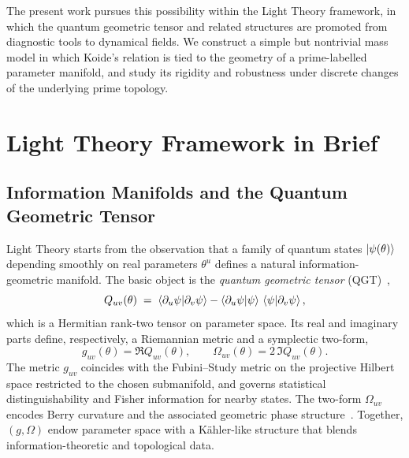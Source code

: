 \documentclass[12pt]{article}
\begin{document}
The present work pursues this possibility within the Light Theory framework,
in which the quantum geometric tensor and related structures are promoted from
diagnostic tools to dynamical fields.  We construct a simple but nontrivial
mass model in which Koide's relation is tied to the geometry of a
prime-labelled parameter manifold, and study its rigidity and robustness under
discrete changes of the underlying prime topology.

\section{Light Theory Framework in Brief}
\label{sec:framework}

\subsection{Information Manifolds and the Quantum Geometric Tensor}

Light Theory starts from the observation that a family of quantum states
$\ket{\psi(\theta)}$ depending smoothly on real parameters $\theta^u$ defines a
natural information-geometric manifold.  The basic object is the
\emph{quantum geometric tensor} (QGT)~\cite{ProvostVallee1980,Zanardi2007},
\begin{equation}
  Q_{uv}(\theta)
  \;=\;
  \braket{\partial_u \psi | \partial_v \psi}
  - \braket{\partial_u \psi | \psi}\,\braket{\psi | \partial_v \psi},
  \label{eq:qgt-definition}
\end{equation}
which is a Hermitian rank-two tensor on parameter space.  Its real and
imaginary parts define, respectively, a Riemannian metric and a symplectic
two-form,
\begin{equation}
  g_{uv}(\theta) = \Re Q_{uv}(\theta),
  \qquad
  \Omega_{uv}(\theta) = 2\,\Im Q_{uv}(\theta).
\end{equation}
The metric $g_{uv}$ coincides with the Fubini--Study metric on the projective
Hilbert space restricted to the chosen submanifold, and governs statistical
distinguishability and Fisher information for nearby states.  The two-form
$\Omega_{uv}$ encodes Berry curvature and the associated geometric phase
structure~\cite{BerryPhaseReview,InformationGeometryReview}.  Together, $(g,\Omega)$ endow parameter space with a Kähler-like structure that blends
information-theoretic and topological data.
\end{document}
